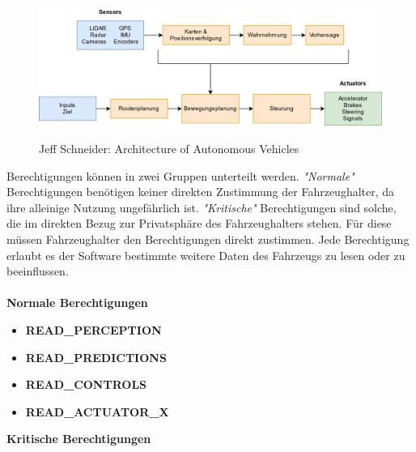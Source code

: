 \begin{figure}[!h]
	\centering
	\includegraphics[width=\columnwidth]{pictures/arichtecture_AV.png}
	\label{img:av_architecture}
	\caption{Jeff Schneider: Architecture of Autonomous Vehicles}
\end{figure}

Berechtigungen können in zwei Gruppen unterteilt werden. \textit{"Normale"} Berechtigungen benötigen keiner direkten Zustimmung der Fahrzeughalter, da ihre alleinige Nutzung ungefährlich ist. \textit{"Kritische"} Berechtigungen sind solche, die im direkten Bezug zur Privatsphäre des Fahrzeughalters stehen. Für diese müssen Fahrzeughalter den Berechtigungen direkt zustimmen. Jede Berechtigung erlaubt es der Software bestimmte weitere Daten des Fahrzeugs zu lesen oder zu beeinflussen.\\\\
\large\textbf{Normale Berechtigungen}
\normalsize
\begin{itemize}
	\item[]\hspace{-0.6cm} \textbf{READ\_PERCEPTION}
	\item[]\hspace{-0.6cm} \textbf{READ\_PREDICTIONS}
	\item[]\hspace{-0.6cm} \textbf{READ\_CONTROLS}
	\item[]\hspace{-0.6cm} \textbf{READ\_ACTUATOR\_X}
\end{itemize}
\large\textbf{Kritische Berechtigungen}
\normalsize
